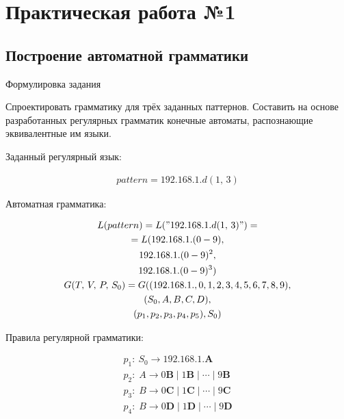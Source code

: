 \documentclass[12pt]{extarticle}
\begin{document}
	
	
	\tableofcontents
	
	\newpage
	
	\section{Практическая работа №1}
	
	\subsection{Построение автоматной грамматики}
	
	Формулировка задания
	
	\par
	
	Спроектировать грамматику для трёх заданных паттернов. Составить на основе разработанных регулярных грамматик конечные автоматы, распознающие эквивалентные им языки.
	
	\par
	
	\noindent Заданный регулярный язык:
	
	\begin{gather*}
		pattern = 192.168.1.d(1, \, 3)	
	\end{gather*}
	
	\noindent Автоматная грамматика:
	
	\begin{gather*}
		L(pattern) = L("192.168.1.d(1, \, 3)") = \\
		= L(192.168.1.(0-9), \\
		    192.168.1.(0-9)^2, \\
		    192.168.1.(0-9)^3) \\
		G(T, \, V, \, P, \, S_0) = G((192.168.1., 0, 1, 2, 3, 4, 5, 6, 7, 8, 9), \\
		(S_0, A, B, C, D), \\
		(p_1, p_2, p_3, p_4, p_5),
		S_0)
	\end{gather*}
	
	\noindent Правила регулярной грамматики:
	
	\begin{gather*}
		p_1 : \: S_0 \rightarrow 192.168.1. \bm{A} \\
		p_2 : \; A \rightarrow 0 \bm{B} \; | \; 1 \bm{B} \; | \; \cdots \; | \; 9 \bm{B} \\
		p_3 : \; B \rightarrow 0 \bm{C} \; | \; 1 \bm{C} \; | \; \cdots \; | \; 9 \bm{C} \\
		p_4 : \; B \rightarrow 0 \bm{D} \; | \; 1 \bm{D} \; | \; \cdots \; | \; 9 \bm{D}
	\end{gather*}
	
\end{document}
